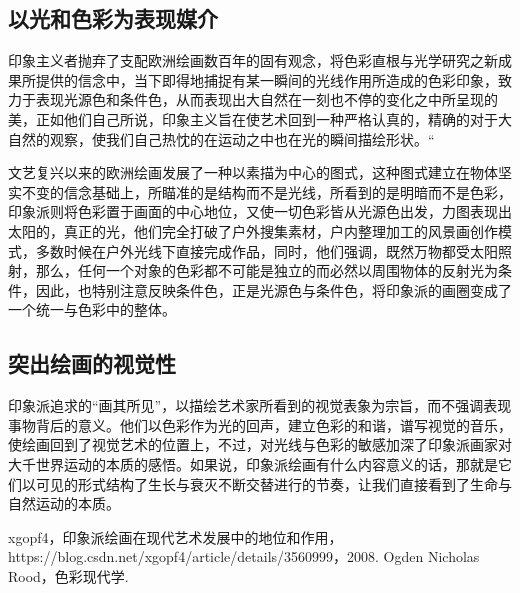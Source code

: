 \documentclass{xcumcmart}
\begin{document}
\subsection{以光和色彩为表现媒介}
\par 印象主义者抛弃了支配欧洲绘画数百年的固有观念，将色彩直根与光学研究之新成果所提供的信念中，当下即得地捕捉有某一瞬间的光线作用所造成的色彩印象，致力于表现光源色和条件色，从而表现出大自然在一刻也不停的变化之中所呈现的美，正如他们自己所说，印象主义旨在使艺术回到一种严格认真的，精确的对于大自然的观察，使我们自己热忱的在运动之中也在光的瞬间描绘形状。“

\par 文艺复兴以来的欧洲绘画发展了一种以素描为中心的图式，这种图式建立在物体坚实不变的信念基础上，所瞄准的是结构而不是光线，所看到的是明暗而不是色彩，印象派则将色彩置于画面的中心地位，又使一切色彩皆从光源色出发，力图表现出太阳的，真正的光，他们完全打破了户外搜集素材，户内整理加工的风景画创作模式，多数时候在户外光线下直接完成作品，同时，他们强调，既然万物都受太阳照射，那么，任何一个对象的色彩都不可能是独立的而必然以周围物体的反射光为条件，因此，也特别注意反映条件色，正是光源色与条件色，将印象派的画圈变成了一个统一与色彩中的整体。
\subsection{突出绘画的视觉性}
\par 印象派追求的“画其所见”，以描绘艺术家所看到的视觉表象为宗旨，而不强调表现事物背后的意义。他们以色彩作为光的回声，建立色彩的和谐，谱写视觉的音乐，使绘画回到了视觉艺术的位置上，不过，对光线与色彩的敏感加深了印象派画家对大千世界运动的本质的感悟。如果说，印象派绘画有什么内容意义的话，那就是它们以可见的形式结构了生长与衰灭不断交替进行的节奏，让我们直接看到了生命与自然运动的本质。\cite{1}

\begin{thebibliography}{1}
     xgopf4，印象派绘画在现代艺术发展中的地位和作用，https://blog.csdn.net/xgopf4/article/details/3560999，2008.
     Ogden Nicholas Rood，色彩现代学.
\end{thebibliography}
\end{document}
